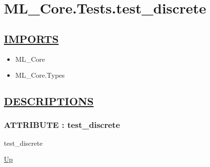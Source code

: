 \chapter*{ML\_Core.Tests.test\_discrete}
\hypertarget{ecldoc:toc:ML_Core.Tests.test_discrete}{}

\section*{\underline{IMPORTS}}
\begin{itemize}
\item ML\_Core
\item ML\_Core.Types
\end{itemize}

\section*{\underline{DESCRIPTIONS}}
\subsection*{ATTRIBUTE : test\_discrete}
\hypertarget{ecldoc:ml_core.tests.test_discrete}{}
\begin{minipage}[t]{\textwidth}
\begin{flushleft}
 test\_discrete 
\end{flushleft}
\end{minipage}
\hyperlink{ecldoc:toc:ML_Core/Tests}{Up}

\par
\par
